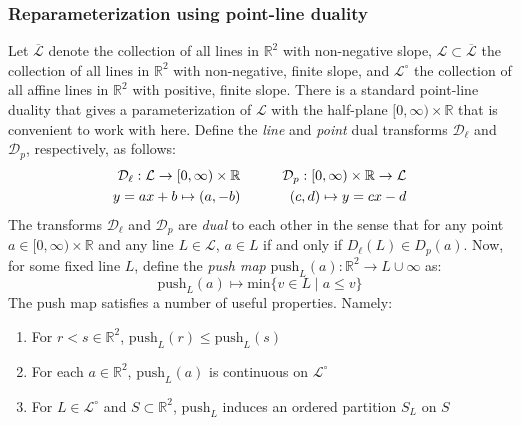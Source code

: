\documentclass[sn-mathphys]{sn-jnl}
\begin{document}
\subsubsection*{Reparameterization using point-line duality}\label{sec:fibered_barcode_reparam}
Let $\overline{\mathcal{L}}$ denote the collection of all lines in $\mathbb{R}^2$ with non-negative slope, $\mathcal{L} \subset \overline{\mathcal{L}}$ the collection of all lines in $\mathbb{R}^2$ with non-negative, finite slope, and $\mathcal{L}^\circ$ the collection of all affine lines in $\mathbb{R}^2$ with positive, finite slope. There is a standard point-line duality that gives a parameterization of $\mathcal{L}$ with the half-plane $[0, \infty) \times \mathbb{R}$ that is convenient to work with here. Define the \emph{line} and \emph{point} dual transforms $\mathcal{D}_{\ell}$ and $\mathcal{D}_p$, respectively, as follows: 
\begin{equation}
	\begin{aligned}
\mathcal{D}_{\ell}: \mathcal{L} \rightarrow[0, \infty) \times \mathbb{R} & \quad \hfill \quad & \mathcal{D}_{p}:[0, \infty) \times \mathbb{R} \rightarrow \mathcal{L} \\
y=a x+b \mapsto(a,-b) &\quad \hfill \quad & (c, d) \mapsto y=c x-d
\end{aligned}
\end{equation}
The transforms $\mathcal{D}_{\ell}$ and $\mathcal{D}_p$ are \emph{dual} to each other in the sense that for any point $a \in [0, \infty) \times \mathbb{R}$ and any line $L \in \mathcal{L}$, $a \in L$ if and only if $D_\ell(L) \in D_{p}(a)$. Now, for some fixed line $L$, define  the \emph{push map} $\mathrm{push}_L(a):  \mathbb{R}^2 \to L \cup \infty$ as: 
\begin{equation}
	\mathrm{push}_L(a) \mapsto \mathrm{min}\{ v \in L \mid a \leq v \}
\end{equation}
The push map satisfies a number of useful properties. Namely: 
\begin{enumerate}
	\item For $r < s \in \mathbb{R}^2$, $\mathrm{push}_L(r) \leq \mathrm{push}_L(s)$
	\item For each $a \in \mathbb{R}^2$, $\mathrm{push}_L(a)$ is continuous on $\mathcal{L}^\circ$
	\item For $L \in \mathcal{L}^\circ$ and $S \subset \mathbb{R}^2$, $\mathrm{push}_L$ induces an ordered partition $S_L$ on $S$ 
\end{enumerate}
\end{document}
